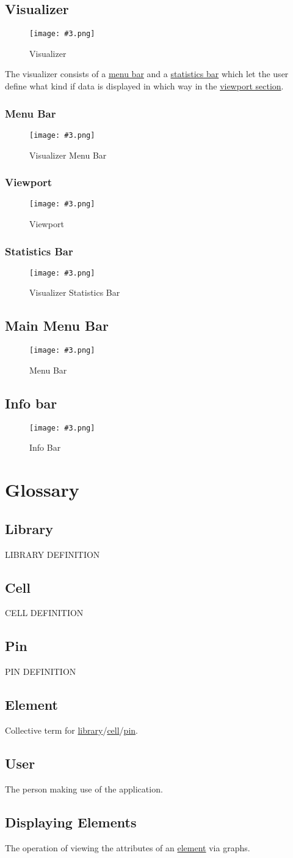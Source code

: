 \documentclass[10pt,a4paper]{report}
\newcommand{\refer}[2]{\hyperref[#1]{\textcolor{col:reference}{#2}}}
\newcommand{\h}[1]{\textcolor{col:highlight}{#1}}
\newcommand{\defg}[3]{\label{glo:#1}\section{#2}#3\\}
\newcommand{\refg}[2]{\refer{glo:#1}{#2}}
\newcommand{\includeimage}[5]{
    \begin{figure}[H]
        #1
        \texttt{[image: \#3.png]}
        \caption{#4}
        \label{fig:#5}
    \end{figure}
}
\begin{document}
\section{Visualizer}
\includeimage{}{0.4}{Visualizer}{Visualizer}{visualizer}
\label{sec:visualizer}
The \h{visualizer} consists of a \refer{sec:visualizer:menu}{menu bar} and a \refer{sec:visualizer:statistics}{statistics bar} which let the user define what kind if data is displayed in which way in the \refer{sec:visualizer:viewport}{viewport section}.


\subsection{Menu Bar}
\label{sec:visualizer:menu}

\includeimage{}{0.4}{Visualizer Menu Bar}{Visualizer Menu Bar}{visualizer_menu_bar}

\subsection{Viewport}
\label{sec:visualizer:viewport}

\includeimage{}{0.4}{Viewport}{Viewport}{viewport}

\subsection{Statistics Bar}
\label{sec:visualizer:statistics}

\includeimage{}{0.4}{Visualizer Statistics Bar}{Visualizer Statistics Bar}{visualizer_statistics_bar}

\section{Main Menu Bar}
\label{sec:menu}

\includeimage{}{0.4}{Menu Bar}{Menu Bar}{menu_bar}

\section{Info bar}
\label{sec:info}

\includeimage{}{0.4}{Info Bar}{Info Bar}{info_bar}

\chapter{Glossary}
\defg{library}{Library}{
    LIBRARY DEFINITION
}
\defg{cell}{Cell}{
    CELL DEFINITION
}
\defg{pin}{Pin}{
    PIN DEFINITION
}
\defg{element}{Element}{
    Collective term for \refg{library}{library}/\refg{cell}{cell}/\refg{pin}{pin}.
}
\defg{user}{User}{
    The person making use of the application.
}
\defg{display_element}{Displaying Elements}{
    The operation of viewing the attributes of an \refg{element}{element} via graphs.
}
\end{document}
